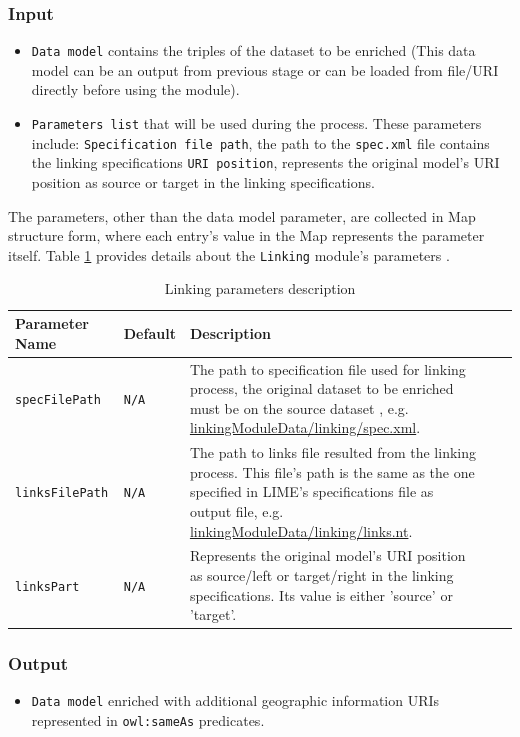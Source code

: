 \documentclass[a4paper,twoside,bibtotoc,abstracton,12pt,BCOR=15mm]{article}
\begin{document}
\subsubsection{Input}
\begin{itemize}
 \item \texttt{Data model} contains the triples of the dataset to be enriched 
 (This data model can be an output from previous stage or can be loaded from file/URI directly before using the module). 
 \item \texttt{Parameters list} that will be used during the process. These parameters include:
 \subitem \texttt{Specification file path}, the path to the \texttt{spec.xml} file contains the linking specifications
 \subitem \texttt{URI position}, represents the original model's URI position as source or target in the linking specifications.
\end{itemize}
The parameters, other than the data model parameter, are  collected in Map structure form,
where each entry's value in the Map represents the parameter itself.
Table \ref{tbl:linkingPram} provides details about the \texttt{Linking} module's parameters .


\begin{table}[ht]
\caption{Linking parameters description} \label{tbl:linkingPram}
\begin{tabular}{@{}  l  l p{7cm} l p{6cm}@{}}
\toprule
\textbf{Parameter Name} & \textbf{Default} & \textbf{Description}\\
\midrule
\texttt{specFilePath} 	& \texttt{N/A} 	& The path to specification file used for linking process, the original dataset to be enriched must be on the source dataset , e.g. \url {linkingModuleData/linking/spec.xml}. \\
\midrule
\texttt{linksFilePath} 	& \texttt{N/A} 	& The path to links file resulted from the linking process. This file's path is the same as the one specified in LIME's specifications file as output file, e.g. \url {linkingModuleData/linking/links.nt}. \\
\midrule
\texttt{linksPart} 	& \texttt{N/A} 	& Represents the original model's URI position as source/left or target/right in the linking specifications. Its value is either 'source' or 'target'.\\ 
\bottomrule
\end{tabular}
\end{table}
\subsubsection{Output}
\begin{itemize}
 \item \texttt{Data model} enriched with additional geographic information URIs represented in \texttt{owl:sameAs} predicates.
\end{itemize}
\end{document}
